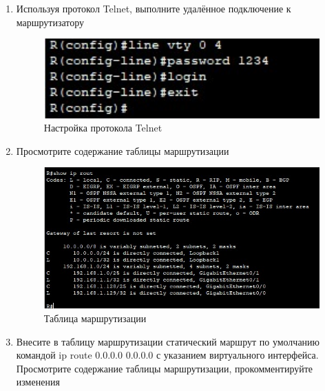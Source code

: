 \documentclass[bachelor, och, labwork]{shiza}
\begin{document}
\begin{enumerate}
        \item Используя протокол Telnet, выполните удалённое подключение к маршрутизатору
        
        \begin{figure}[H]
            \centering      %
            \includegraphics[width=1\textwidth]{14}
            \caption{Настройка протокола Telnet}
            \label{fig:image1}
        \end{figure}

        \item Просмотрите содержание таблицы маршрутизации
        
        \begin{figure}[H]
            \centering      %
            \includegraphics[width=1\textwidth]{15}
            \caption{Таблица маршрутизации}
            \label{fig:image1}
        \end{figure}

        \item Внесите в таблицу маршрутизации статический маршрут по умолчанию командой ip route 0.0.0.0 0.0.0.0 с указанием виртуального интерфейса.
        Просмотрите содержание таблицы маршрутизации, прокомментируйте изменения
        

\end{enumerate}
\end{document}
